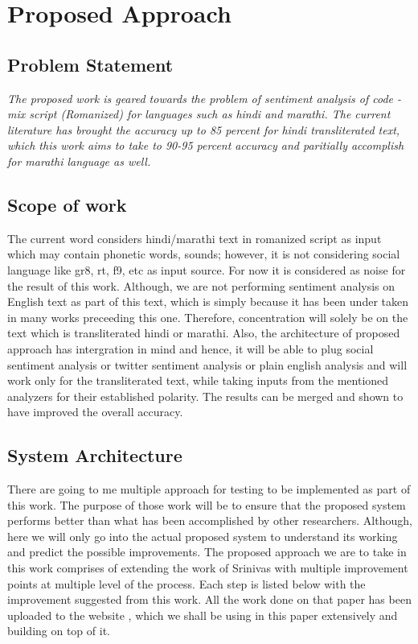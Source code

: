 \documentclass[12pt]{book}
\begin{document}
\chapter{Proposed Approach}

\section{Problem Statement}

\textit{The proposed work is geared towards the problem of sentiment analysis
    of code - mix script (Romanized) for languages such as hindi and marathi.
    The current literature has brought the accuracy up to 85 percent for hindi
    transliterated text, which this work aims to take to 90-95 percent accuracy
    and paritially accomplish for marathi language as well.}


\section{Scope of work}

The current word considers hindi/marathi text in romanized script as input
which may contain phonetic words, sounds; however, it is not considering social
language like gr8, rt, f9, etc as input source. For now it is considered as
noise for the result of this work. Although, we are not performing sentiment
analysis on English text as part of this text, which is simply because it has
been under taken in many works preceeding this one. Therefore, concentration
will solely be on the text which is transliterated hindi or marathi. Also, the
architecture of proposed approach has intergration in mind and hence, it will
be able to plug social sentiment analysis or twitter sentiment analysis or
plain english analysis and will work only for the transliterated text, while
taking inputs from the mentioned analyzers for their established polarity. The
results can be merged and shown to have improved the overall accuracy. 


\section{System Architecture}

There are going to me multiple approach for testing to be implemented as part
of this work. The purpose of those work will be to ensure that the proposed
system performs better than what has been accomplished by other researchers.
Although, here we will only go into the actual proposed system to understand
its working and predict the possible improvements.
The proposed approach we are to take in this work comprises of extending the
work of Srinivas \cite{shashank_sharma_sentiment_????} with multiple
improvement points at multiple level of the process. Each step is listed below
with the improvement suggested from this work. All the work done on that paper
has been uploaded to the website \cite{_linguistic_????}, which we shall be
using in this paper extensively and building on top of it. 
\end{document}
